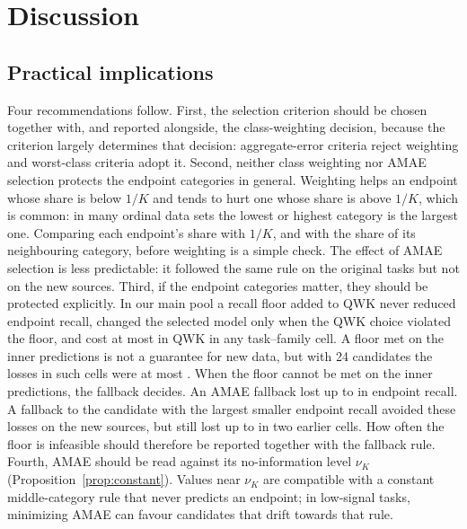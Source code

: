 \documentclass[pdflatex,sn-mathphys-ay]{sn-jnl}
\theoremstyle{thmstyleone}
\theoremstyle{thmstylethree}
\begin{document}
\section{Discussion}\label{sec:discussion}

\subsection{Practical implications}

Four recommendations follow. First, the selection criterion should be chosen together with, and reported alongside, the class-weighting decision, because the criterion largely determines that decision: aggregate-error criteria reject weighting and worst-class criteria adopt it. Second, neither class weighting nor AMAE selection protects the endpoint categories in general. Weighting helps an endpoint whose share is below $1/K$ and tends to hurt one whose share is above $1/K$, which is common: in many ordinal data sets the lowest or highest category is the largest one. Comparing each endpoint's share with $1/K$, and with the share of its neighbouring category, before weighting is a simple check. The effect of AMAE selection is less predictable: it followed the same rule on the original tasks but not on the new sources. Third, if the endpoint categories matter, they should be protected explicitly. In our main pool a recall floor added to QWK never reduced endpoint recall, changed the selected model only when the QWK choice violated the floor, and cost at most \ConQwkCostMaxAbs{} in QWK in any task--family cell. A floor met on the inner predictions is not a guarantee for new data, but with 24 candidates the losses in such cells were at most \FloorFeasMaxLoss{}. When the floor cannot be met on the inner predictions, the fallback decides. An AMAE fallback lost up to \VfourAllMinOrigAbs{} in endpoint recall. A fallback to the candidate with the largest smaller endpoint recall avoided these losses on the new sources, but still lost up to \VfourOldMinAbs{} in two earlier cells. How often the floor is infeasible should therefore be reported together with the fallback rule. Fourth, AMAE should be read against its no-information level $\nu_K$ (Proposition~\ref{prop:constant}). Values near $\nu_K$ are compatible with a constant middle-category rule that never predicts an endpoint; in low-signal tasks, minimizing AMAE can favour candidates that drift towards that rule.
\end{document}

